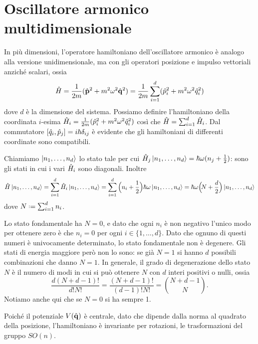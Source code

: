 \section{Oscillatore armonico multidimensionale}
In più dimensioni, l'operatore hamiltoniano dell'oscillatore armonico è analogo alla versione unidimensionale, ma con gli operatori posizione e impulso vettoriali anzich\'e scalari, ossia
\begin{equation}
	\hat{H}=\frac1{2m}(\hat{\mathbf{p}}^2+m^2\omega^2\hat{\mathbf{q}}^2)=\frac1{2m}\sum_{i=1}^d(\hat{p}_i^2+m^2\omega^2\hat{q}_i^2)
	\label{eq:hamiltoniano-oscillatore-armonico-multidim}
\end{equation}
dove $d$ è la dimensione del sistema.
Possiamo definire l'hamiltoniano della coordinata $i$-esima $\hat{H}_i=\frac1{2m}(\hat{p}_i^2+m^2\omega^2\hat{q}_i^2)$ cos\`i che $\hat{H}=\sum_{i=1}^d\hat{H}_i$.
Dal commutatore $[\hat{q}_i,\hat{p}_j]=i\hbar\delta_{ij}$ è evidente che gli hamiltoniani di differenti coordinate sono compatibili.

Chiamiamo $\left|{n_1,\dots,n_d}\right\rangle$ lo stato tale per cui $\hat{H}_j\left|{n_1,\dots,n_d}\right\rangle=\hbar\omega(n_j+\frac12)$: sono gli stati in cui i vari $\hat{H}_i$ sono diagonali.
Inoltre
\begin{equation}
	\hat{H}\left|{n_1,\dots,n_d}\right\rangle=\sum_{i=1}^d\hat{H}_i\left|{n_1,\dots,n_d}\right\rangle=\sum_{i=1}^d\Big(n_i+\frac12\Big)\hbar\omega\left|{n_1,\dots,n_d}\right\rangle=\hbar\omega\Big(\!N+\frac{d}2\Big)\left|{n_1,\dots,n_d}\right\rangle
\end{equation}
dove $N\defeq\sum_{i=1}^dn_i$.

Lo stato fondamentale ha $N=0$, e dato che ogni $n_i$ è non negativo l'unico modo per ottenere zero è che $n_i=0$ per ogni $i\in\{1,\dots,d\}$.
Dato che ognuno di questi numeri è univocamente determinato, lo stato fondamentale non è degenere.
Gli stati di energia maggiore però non lo sono: se già $N=1$ si hanno $d$ possibili combinazioni che danno $N=1$.
In generale, il grado di degenerazione dello stato $N$ è il numero di modi in cui si può ottenere $N$ con $d$ interi positivi o nulli, ossia
\begin{equation}
	\frac{d(N+d-1)!}{d!N!}=\frac{(N+d-1)!}{(d-1)!N!}=\binom{N+d-1}{N}.
\end{equation}
Notiamo anche qui che se $N=0$ si ha sempre 1.

Poich\'e il potenziale $V(\hat{\mathbf{q}})$ è centrale, dato che dipende dalla norma al quadrato della posizione, l'hamiltoniano è invariante per rotazioni, le trasformazioni del gruppo $SO(n)$.

